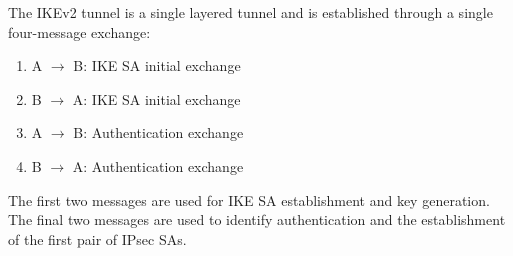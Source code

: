 The IKEv2 tunnel is a single layered tunnel and is established through a single four-message exchange:
\begin{enumerate}
    \item A $\rightarrow$ B: IKE SA initial exchange
    \item B $\rightarrow$ A: IKE SA initial exchange
    \item A $\rightarrow$ B: Authentication exchange
    \item B $\rightarrow$ A: Authentication exchange
\end{enumerate}

The first two messages are used for IKE SA establishment and key generation. The final two messages are used to identify authentication and the establishment of the first pair of IPsec SAs. 